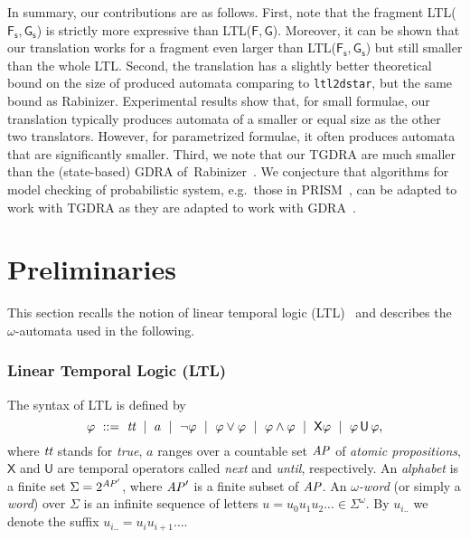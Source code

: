 \documentclass{llncs}
\newcommand{\X}{\mathsf{X}}     \newcommand{\U}{{\,\uU\,}}      \newcommand{\uU}{\mathsf{U}}    \newcommand{\rR}{\mathsf{R}}    \newcommand{\R}{{\,\rR\,}}      \newcommand{\F}{\mathsf{F}}     \newcommand{\G}{\mathsf{G}}     \newcommand{\Fs}{{\F\!\s}}      \newcommand{\Gs}{{\G\s}}        \newcommand{\s}{_\mathsf{s}}
\newcommand{\true}{\textrm{{\it tt}}}
\newcommand{\AP}{\mathit{A\hskip-0.1ex P}}
\newcommand{\suf}[1]{_{#1..}}
\begin{document}
In summary, our contributions are as follows.  First, note that the
fragment LTL($\Fs,\Gs$) is strictly more expressive than
LTL($\F,\G$). Moreover, it can be shown that our translation works for a
fragment even larger than LTL($\Fs,\Gs$) but still smaller than the
whole LTL. 
Second, the translation has a slightly better theoretical bound on the
size of produced automata comparing to \texttt{ltl2dstar}, but the same
bound as Rabinizer. Experimental results show that, for small formulae,
our translation typically produces automata of a smaller or equal size
as the other two translators.  However, for parametrized formulae, it
often produces automata that are significantly smaller. Third, we note
that our TGDRA are much smaller than the (state-based) GDRA
of~Rabinizer~\cite{GKE12}. We conjecture that algorithms for model checking of
probabilistic system, e.g.~those in PRISM~\cite{KNP11}, can be adapted
to work with TGDRA as they are adapted to work with GDRA~\cite{CGK13}.














\section{Preliminaries}\label{sec:prelim}
This section recalls the notion of linear temporal logic (LTL)~\cite{Pnu77} 
and describes the $\omega$-automata used in the following.



\subsubsection{Linear Temporal Logic (LTL)}

The syntax of LTL is defined by
\[
\varphi~::=~\true~\mid~a~\mid~\neg\varphi~\mid~\varphi\vee\varphi~\mid~
\varphi\wedge\varphi~\mid~\X\varphi~\mid~ \varphi\U\varphi\textrm{,}
\]
where $\true$ stands for \emph{true}, $a$ ranges over a countable set $\AP$
of \emph{atomic propositions}, $\X$ and $\uU$ are temporal operators called
\emph{next} and \emph{until}, respectively. An \emph{alphabet} is a finite
set $\Sigma=2^{\AP'}$, where $\AP'$ is a finite subset of $\AP$. An
\emph{$\omega$-word} (or simply a \emph{word}) over $\Sigma$ is an infinite
sequence of letters $u=u_0u_1u_2\ldots\in\Sigma^\omega$. By $u\suf{i}$ we
denote the suffix $u\suf{i}=u_iu_{i+1}\ldots$.
\end{document}
